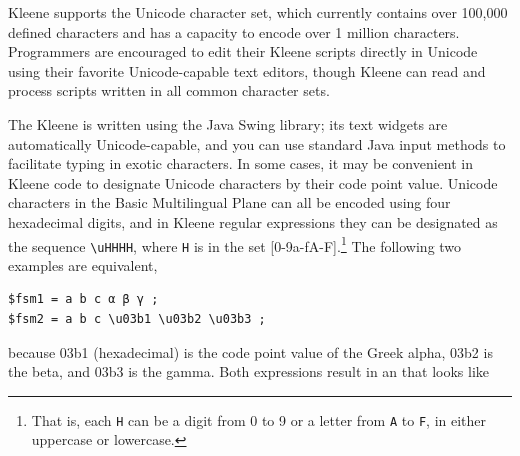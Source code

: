 Kleene supports the Unicode character set, 
which currently contains over 100,000 defined characters and has a capacity
to encode over 1 million characters.  Programmers are encouraged to edit their Kleene scripts
directly in Unicode using their favorite Unicode-capable text editors, though Kleene 
can read and process scripts written in all common character sets.  

The Kleene \gui{} is written using the Java Swing library; its text widgets are
automatically Unicode-capable, and you can use standard Java input methods to facilitate
typing in exotic characters.  In some cases, it may be convenient in
Kleene code to designate Unicode
characters by their code point value.  Unicode characters in the Basic Multilingual Plane
can all be encoded using four hexadecimal digits, and in Kleene regular expressions they
can be designated as the  sequence \verb!\uHHHH!, where \texttt{H} is in the
set [0-9a-fA-F].\footnote{That is, each \texttt{H} can be a digit from 0 to 9 or a letter
from \texttt{A} to \texttt{F}, in either uppercase or lowercase.}  The following two
examples are equivalent,


\begin{Verbatim}
$fsm1 = a b c α β γ ;
$fsm2 = a b c \u03b1 \u03b2 \u03b3 ;
\end{Verbatim}

\noindent
because 03b1 (hexadecimal) is the code point value of the Greek alpha, 03b2 is the beta,
and 03b3 is the gamma.  Both expressions result in an \fsm{} that looks like


